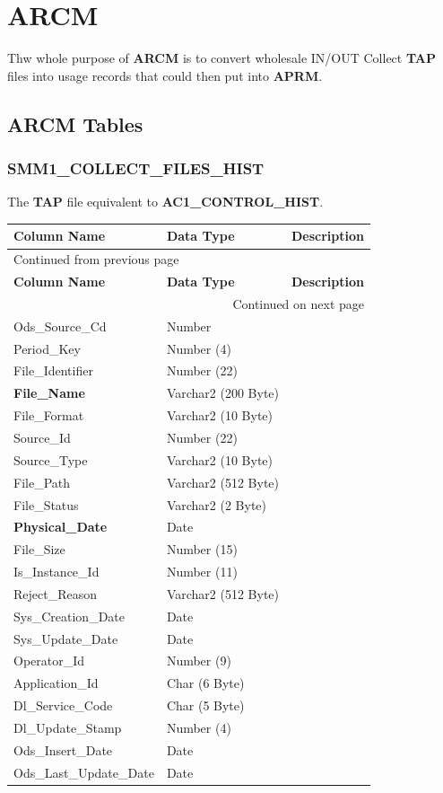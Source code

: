 \documentclass[12pt,twoside]{article}
\begin{document}
\section{ARCM}
\label{sec:orgheadline86}
Thw whole purpose of \textbf{ARCM} is to convert wholesale IN/OUT Collect \textbf{TAP} files into usage records
that could then put into \textbf{APRM}. 
\subsection{ARCM Tables}
\label{sec:orgheadline85}
\subsubsection{SMM1\_COLLECT\_FILES\_HIST}
\label{sec:orgheadline80}
The \textbf{TAP} file equivalent to \textbf{AC1\_CONTROL\_HIST}. 
\footnotesize

\begin{longtable}{l|l|l}
\hline
\textbf{Column Name} & \textbf{Data Type} & \textbf{Description}\\
\hline
\endfirsthead
\multicolumn{3}{l}{Continued from previous page} \\
\hline

\textbf{Column Name} & \textbf{Data Type} & \textbf{Description} \\

\hline
\endhead
\hline\multicolumn{3}{r}{Continued on next page} \\
\endfoot
\endlastfoot
\hline
Ods\_Source\_Cd & Number & \\
Period\_Key & Number (4) & \\
File\_Identifier & Number (22) & \\
\textbf{File\_Name} & Varchar2 (200 Byte) & \\
File\_Format & Varchar2 (10 Byte) & \\
Source\_Id & Number (22) & \\
Source\_Type & Varchar2 (10 Byte) & \\
File\_Path & Varchar2 (512 Byte) & \\
File\_Status & Varchar2 (2 Byte) & \\
\textbf{Physical\_Date} & Date & \\
File\_Size & Number (15) & \\
Is\_Instance\_Id & Number (11) & \\
Reject\_Reason & Varchar2 (512 Byte) & \\
Sys\_Creation\_Date & Date & \\
Sys\_Update\_Date & Date & \\
Operator\_Id & Number (9) & \\
Application\_Id & Char (6 Byte) & \\
Dl\_Service\_Code & Char (5 Byte) & \\
Dl\_Update\_Stamp & Number (4) & \\
Ods\_Insert\_Date & Date & \\
Ods\_Last\_Update\_Date & Date & \\
\hline
\end{longtable}
\end{document}
